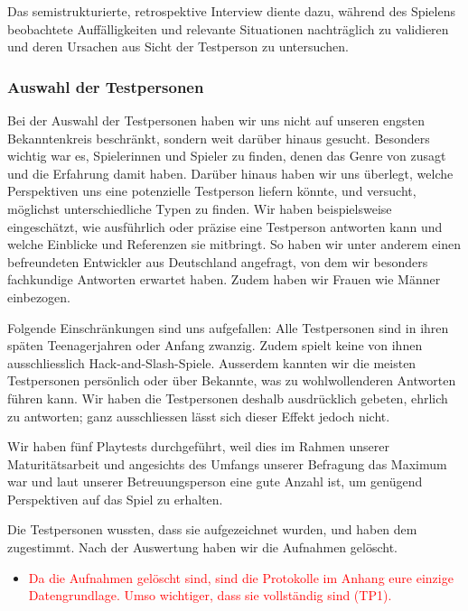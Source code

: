 \documentclass[../Main.tex]{subfiles}
\begin{document}
Das semistrukturierte, retrospektive Interview diente dazu, während des Spielens beobachtete Auffälligkeiten und relevante Situationen nachträglich zu validieren und deren Ursachen aus Sicht der Testperson zu untersuchen.\autocite[\textcolor{red}{S.~??}]{drachen2018gamesuserresearch}

\subsubsection{Auswahl der Testpersonen} \label{sec:AuswahlTP}
Bei der Auswahl der Testpersonen haben wir uns nicht auf unseren engsten Bekanntenkreis beschränkt, sondern weit darüber hinaus gesucht. Besonders wichtig war es, Spielerinnen und Spieler zu finden, denen das Genre von  zusagt und die Erfahrung damit haben. Darüber hinaus haben wir uns überlegt, welche Perspektiven uns eine potenzielle Testperson liefern könnte, und versucht, möglichst unterschiedliche Typen zu finden. Wir haben beispielsweise eingeschätzt, wie ausführlich oder präzise eine Testperson antworten kann und welche Einblicke und Referenzen sie mitbringt. So haben wir unter anderem einen befreundeten Entwickler aus Deutschland angefragt, von dem wir besonders fachkundige Antworten erwartet haben. Zudem haben wir Frauen wie Männer einbezogen.

Folgende Einschränkungen sind uns aufgefallen: Alle Testpersonen sind in ihren späten Teenagerjahren oder Anfang zwanzig. Zudem spielt keine von ihnen ausschliesslich Hack-and-Slash-Spiele. Ausserdem kannten wir die meisten Testpersonen persönlich oder über Bekannte, was zu wohlwollenderen Antworten führen kann. Wir haben die Testpersonen deshalb ausdrücklich gebeten, ehrlich zu antworten; ganz ausschliessen lässt sich dieser Effekt jedoch nicht.

Wir haben fünf Playtests durchgeführt, weil dies im Rahmen unserer Maturitätsarbeit und angesichts des Umfangs unserer Befragung das Maximum war und laut unserer Betreuungsperson eine gute Anzahl ist, um genügend Perspektiven auf das Spiel zu erhalten.

Die Testpersonen wussten, dass sie aufgezeichnet wurden, und haben dem zugestimmt. Nach der Auswertung haben wir die Aufnahmen gelöscht.

\begin{itemize}[leftmargin=1.5cm]
    \item \textcolor{red}{Da die Aufnahmen gelöscht sind, sind die Protokolle im Anhang eure einzige Datengrundlage. Umso wichtiger, dass sie vollständig sind (TP1).}
\end{itemize}
\end{document}
